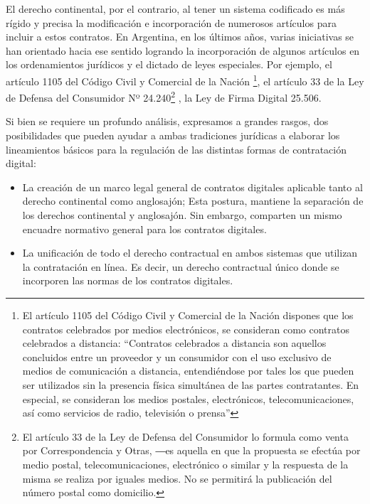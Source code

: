 \documentclass[12pt]{report} %
\begin{document}
El derecho continental, por el contrario, al tener un sistema codificado es más rígido y precisa la modificación e incorporación de numerosos artículos para incluir a estos contratos. En Argentina, en los últimos años, varias iniciativas se han orientado hacia ese sentido logrando la incorporación de algunos artículos en los ordenamientos jurídicos y el dictado de leyes especiales. Por ejemplo, el artículo 1105 del Código Civil y Comercial de la Nación \footnote{El artículo 1105 del Código Civil y Comercial de la Nación dispones que los contratos celebrados por medios electrónicos, se consideran como contratos celebrados a distancia: “Contratos celebrados a distancia son aquellos concluidos entre un proveedor y un consumidor con el uso exclusivo de medios de comunicación a distancia, entendiéndose por tales los que pueden ser utilizados sin la presencia física simultánea de las partes contratantes. En especial, se consideran los medios postales, electrónicos, telecomunicaciones, así como servicios de radio, televisión o prensa”},  el artículo 33 de la Ley de Defensa del Consumidor Nº 24.240\footnote{El artículo 33 de la Ley de Defensa del Consumidor lo formula como venta por Correspondencia y Otras, ―es aquella en que la propuesta se efectúa por medio postal, telecomunicaciones, electrónico o similar y la respuesta de la misma se realiza por iguales medios. No se permitirá la publicación del número postal como domicilio.} , la Ley de Firma Digital 25.506.

Si bien  se  requiere  un  profundo análisis,  expresamos a grandes rasgos,  dos posibilidades que pueden ayudar a ambas tradiciones jurídicas a elaborar los lineamientos básicos para la regulación de las distintas formas de contratación digital:

\begin{itemize}
    \item La creación de un marco legal general de contratos digitales aplicable tanto al derecho continental como anglosajón; Esta postura, mantiene la separación de los derechos continental y anglosajón. Sin embargo, comparten un mismo encuadre normativo general para los contratos digitales.
    \item La unificación de todo el derecho contractual en ambos sistemas que utilizan la contratación en línea. Es decir, un derecho contractual único donde se incorporen las normas de los contratos digitales.
\end{itemize}
\end{document}
